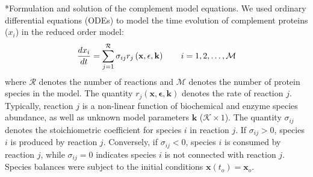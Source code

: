\documentclass[12pt]{article}
\makeatletter
\renewcommand\subsection{\@startsection
	{subsection}{2}{0mm}
	{-0.05in}
	{-0.5\baselineskip}
	{\normalfont\normalsize\bfseries}}
\makeatother
\begin{document}
\subsection*{Formulation and solution of the complement model equations.}
We used ordinary differential equations (ODEs) to model the time evolution of complement proteins ($x_{i}$) in the reduced order model:
\begin{equation}
	\frac{dx_{i}}{dt}  =  \sum_{j = 1}^{\mathcal{R}}\sigma_{ij}r_{j}\left(\mathbf{x},\mathbf{\epsilon},\mathbf{k}\right)\qquad{i=1,2,\hdots,\mathcal{M}}\\
\end{equation}
where $\mathcal{R}$ denotes the number of reactions and $\mathcal{M}$ denotes the number of protein species in the model.
The quantity $r_{j}\left(\mathbf{x},\mathbf{\epsilon},\mathbf{k}\right)$ denotes the rate of reaction $j$.
Typically, reaction $j$ is a non-linear function of biochemical and enzyme species abundance, as well as unknown model parameters $\mathbf{k}$ ($\mathcal{K}\times{1}$).
The quantity $\sigma_{ij}$ denotes the stoichiometric coefficient for species $i$ in reaction $j$.
If $\sigma_{ij}>0$, species $i$ is produced by reaction $j$.
Conversely, if $\sigma_{ij}<0$, species $i$ is consumed by reaction $j$, while $\sigma_{ij} = 0$ indicates species $i$ is not connected with reaction $j$.
Species balances were subject to the initial conditions $\mathbf{x}\left(t_{o}\right) = \mathbf{x}_{o}$.
\end{document}
